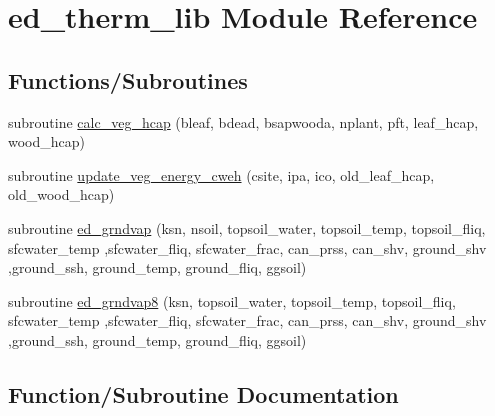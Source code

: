 \hypertarget{namespaceed__therm__lib}{}\section{ed\+\_\+therm\+\_\+lib Module Reference}
\label{namespaceed__therm__lib}
\subsection*{Functions/\+Subroutines}
\begin{DoxyCompactItemize}
\item 
subroutine \hyperlink{namespaceed__therm__lib_a882f2cd5f4a75f8c01d2167f45afebb7}{calc\+\_\+veg\+\_\+hcap} (bleaf, bdead, bsapwooda, nplant, pft, leaf\+\_\+hcap, wood\+\_\+hcap)
\item 
subroutine \hyperlink{namespaceed__therm__lib_ae2a805729a52bf5814d2c3a0d84f6fe8}{update\+\_\+veg\+\_\+energy\+\_\+cweh} (csite, ipa, ico, old\+\_\+leaf\+\_\+hcap, old\+\_\+wood\+\_\+hcap)
\item 
subroutine \hyperlink{namespaceed__therm__lib_ad7497e216325854214ab9dd57a26f6ee}{ed\+\_\+grndvap} (ksn, nsoil, topsoil\+\_\+water, topsoil\+\_\+temp, topsoil\+\_\+fliq, sfcwater\+\_\+temp                                                                                                   ,sfcwater\+\_\+fliq, sfcwater\+\_\+frac, can\+\_\+prss, can\+\_\+shv, ground\+\_\+shv                                                                                                                                   ,ground\+\_\+ssh, ground\+\_\+temp, ground\+\_\+fliq, ggsoil)
\item 
subroutine \hyperlink{namespaceed__therm__lib_aeb9ec19b3f02291df9155b6204fecf9e}{ed\+\_\+grndvap8} (ksn, topsoil\+\_\+water, topsoil\+\_\+temp, topsoil\+\_\+fliq, sfcwater\+\_\+temp                                                                                                                           ,sfcwater\+\_\+fliq, sfcwater\+\_\+frac, can\+\_\+prss, can\+\_\+shv, ground\+\_\+shv                                                                                                                                   ,ground\+\_\+ssh, ground\+\_\+temp, ground\+\_\+fliq, ggsoil)
\end{DoxyCompactItemize}


\subsection{Function/\+Subroutine Documentation}
\hypertarget{namespaceed__therm__lib_a882f2cd5f4a75f8c01d2167f45afebb7}{}
